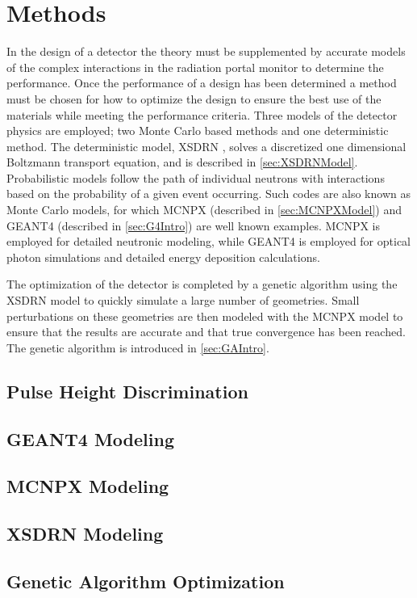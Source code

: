 \chapter{Methods}
\label{chap:methods}
In the design of a detector the theory must be supplemented by accurate models of the complex interactions in the radiation portal monitor to determine the performance.
Once the performance of a design has been determined a method must be chosen for how to optimize the design to  ensure the best use of the materials while meeting the performance criteria.
Three models of the detector physics are employed; two Monte Carlo based methods and one deterministic method.
The deterministic model, XSDRN \cite{XSDRNPM_2011}, solves a discretized one dimensional Boltzmann transport equation, and is described in \autoref{sec:XSDRNModel}.
Probabilistic models follow the path of individual neutrons with interactions based on the probability of a given event occurring.
Such codes are also known as Monte Carlo models, for which MCNPX (described in \autoref{sec:MCNPXModel}) and GEANT4 (described in \autoref{sec:G4Intro}) are well known examples.
MCNPX is employed for detailed neutronic modeling, while GEANT4 is employed for optical photon simulations and detailed energy deposition calculations.

The optimization of the detector is completed by a genetic algorithm using the XSDRN model to quickly simulate a large number of geometries.
Small perturbations on these geometries are then modeled with the MCNPX model to ensure that the results are accurate and that true convergence has been reached.
The genetic algorithm is introduced in \autoref{sec:GAIntro}.

\section{Pulse Height Discrimination}
\label{sec:PulseHeightDiscrm}


\section{GEANT4 Modeling}
\label{sec:G4Intro}


\section{MCNPX Modeling}
\label{sec:MCNPXModel}


\section{XSDRN Modeling}
\label{sec:XSDRNModel}


\section{Genetic Algorithm Optimization}
\label{sec:GAIntro}

